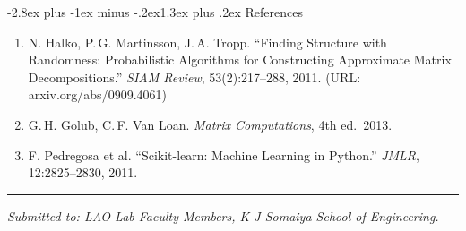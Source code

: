 \documentclass[12pt,a4paper]{article}
\makeatletter
\renewcommand{\section}{\@startsection{section}{1}{\z@}
  {-2.8ex plus -1ex minus -.2ex}{1.3ex plus .2ex}
  {\large\bfseries\color{deepblue}}}
\makeatother
\begin{document}
\section{References}

\begin{enumerate}[leftmargin=1.8em, itemsep=3pt]
  \item N. Halko, P.\,G. Martinsson, J.\,A. Tropp.
    ``Finding Structure with Randomness: Probabilistic Algorithms for Constructing
    Approximate Matrix Decompositions.''
    \textit{SIAM Review}, 53(2):217--288, 2011.
    (URL: arxiv.org/abs/0909.4061)

  \item G.\,H. Golub, C.\,F. Van Loan.
    \textit{Matrix Computations}, 4th ed.\ 2013.

  \item F. Pedregosa et al.
    ``Scikit-learn: Machine Learning in Python.''
    \textit{JMLR}, 12:2825--2830, 2011.
\end{enumerate}

\vspace{1.5em}
\noindent\rule{\linewidth}{0.8pt}
\vspace{0.3em}

\noindent\small\textit{%
Submitted to: LAO Lab Faculty Members, K J Somaiya School of Engineering.}
\end{document}
